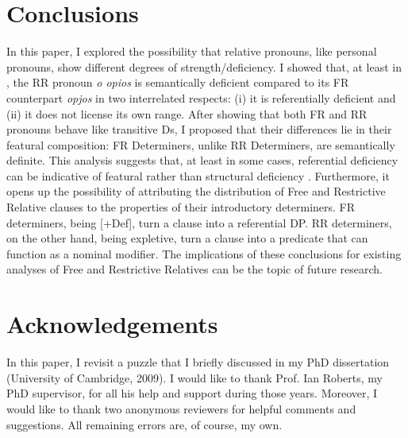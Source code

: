 \documentclass[output=paper]{langsci/langscibook}
\begin{document}
\section{Conclusions}\label{sec:key:01.5}

In this paper, I explored the possibility that relative pronouns, like personal
pronouns, show different degrees of strength/deficiency. I showed that, at
least in , the \gls{RR} pronoun \emph{o opios} is semantically deficient
compared to its \gls{FR} counterpart \emph{opjos} in two interrelated respects:
(i) it is referentially deficient and (ii) it does not license its own range.
After showing that both \gls{FR} and \gls{RR} pronouns behave like transitive
Ds, I proposed that their differences lie in their featural composition:
\gls{FR} Determiners, unlike \gls{RR} Determiners, are semantically definite. This
analysis suggests that, at least in some cases, referential deficiency can be
indicative of featural rather than structural deficiency
\parencite[cf.][]{CarSta1999,DecWil2002}.  Furthermore, it opens up the
possibility of attributing the distribution of Free and Restrictive Relative
clauses to the properties of their introductory determiners. \gls{FR}
determiners, being [+Def], turn a clause into a referential DP. \gls{RR}
determiners, on the other hand, being expletive, turn a clause into a predicate
that can function as a nominal modifier. The implications of these conclusions
for existing analyses of Free and Restrictive Relatives can be the topic of
future research.

\printchapterglossary{}

\section*{Acknowledgements}

In this paper, I revisit a puzzle that I briefly discussed in my PhD
dissertation (University of Cambridge, 2009). I would like to thank Prof. Ian
Roberts, my PhD supervisor, for all his help and support during those years.
Moreover, I would like to thank two anonymous reviewers for helpful comments
and suggestions. All remaining errors are, of course, my own.

{\sloppy
\printbibliography[heading=subbibliography,notkeyword=this]
}
\end{document}

